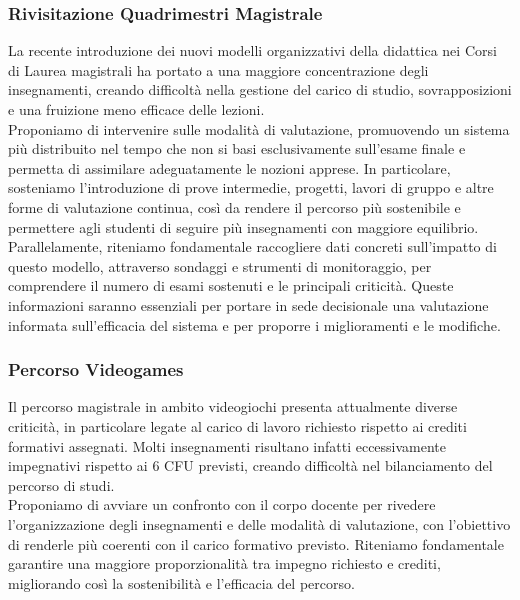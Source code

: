 \documentclass[12pt,a4paper]{article}
\begin{document}
\subsubsection{Rivisitazione Quadrimestri Magistrale}
La recente introduzione dei nuovi modelli organizzativi della didattica nei Corsi di Laurea magistrali ha portato a una maggiore concentrazione degli insegnamenti, creando difficoltà nella gestione del carico di studio, sovrapposizioni e una fruizione meno efficace delle lezioni.
\\ Proponiamo di intervenire sulle modalità di valutazione, promuovendo un sistema più distribuito nel tempo che non si basi esclusivamente sull’esame finale e permetta di assimilare adeguatamente le nozioni apprese. In particolare, sosteniamo l’introduzione di prove intermedie, progetti, lavori di gruppo e altre forme di valutazione continua, così da rendere il percorso più sostenibile e permettere agli studenti di seguire più insegnamenti con maggiore equilibrio.
\\ Parallelamente, riteniamo fondamentale raccogliere dati concreti sull’impatto di questo modello, attraverso sondaggi e strumenti di monitoraggio, per comprendere il numero di esami sostenuti e le principali criticità. Queste informazioni saranno essenziali per portare in sede decisionale una valutazione informata sull’efficacia del sistema e per proporre i miglioramenti e le modifiche.

\subsubsection{Percorso Videogames}
Il percorso magistrale in ambito videogiochi presenta attualmente diverse criticità, in particolare legate al carico di lavoro richiesto rispetto ai crediti formativi assegnati. Molti insegnamenti risultano infatti eccessivamente impegnativi rispetto ai 6 CFU previsti, creando difficoltà nel bilanciamento del percorso di studi.
\\ Proponiamo di avviare un confronto con il corpo docente per rivedere l’organizzazione degli insegnamenti e delle modalità di valutazione, con l’obiettivo di renderle più coerenti con il carico formativo previsto. Riteniamo fondamentale garantire una maggiore proporzionalità tra impegno richiesto e crediti, migliorando così la sostenibilità e l’efficacia del percorso.
\end{document}
